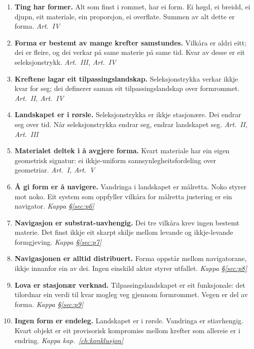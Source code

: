 \documentclass[12pt,a4paper,oneside]{report}
\begin{document}
\begin{enumerate}
  \item \textbf{Ting har former.} Alt som finst i rommet, har ei form. Ei høgd, ei breidd, ei djupn, eit materiale, ein proporsjon, ei overflate. Summen av alt dette er forma. \hfill\emph{Art.~IV}

  \item \textbf{Forma er bestemt av mange krefter samstundes.} Vilkåra er aldri eitt; dei er fleire, og dei verkar på same materie på same tid. Kvar av desse er eit seleksjonstrykk. \hfill\emph{Art.~III, Art.~IV}

  \item \textbf{Kreftene lagar eit tilpassingslandskap.} Seleksjonstrykka verkar ikkje kvar for seg; dei definerer saman eit tilpassingslandskap over formrommet. \hfill\emph{Art.~II, Art.~IV}

  \item \textbf{Landskapet er i rørsle.} Seleksjonstrykka er ikkje stasjonære. Dei endrar seg over tid. Når seleksjonstrykka endrar seg, endrar landskapet seg. \hfill\emph{Art.~II, Art.~III}

  \item \textbf{Materialet deltek i å avgjere forma.} Kvart materiale har ein eigen geometrisk signatur: ei ikkje-uniform sannsynlegheitsfordeling over geometriar. \hfill\emph{Art.~I, Art.~V}

  \item \textbf{Å gi form er å navigere.} Vandringa i landskapet er målretta. Noko styrer mot noko. Eit system som oppfyller vilkåra for målretta justering er ein navigator. \hfill\emph{Kappa \S\ref{sec:p6}}

  \item \textbf{Navigasjon er substrat-uavhengig.} Dei tre vilkåra krev ingen bestemt materie. Det finst ikkje eit skarpt skilje mellom levande og ikkje-levande formgjeving. \hfill\emph{Kappa \S\ref{sec:p7}}

  \item \textbf{Navigasjonen er alltid distribuert.} Forma oppstår mellom navigatorane, ikkje innanfor ein av dei. Ingen einskild aktør styrer utfallet. \hfill\emph{Kappa \S\ref{sec:p8}}

  \item \textbf{Lova er stasjonær verknad.} Tilpassingslandskapet er eit funksjonale: det tilordnar ein verdi til kvar mogleg veg gjennom formrommet. Vegen er del av forma. \hfill\emph{Kappa \S\ref{sec:p9}}

  \item \textbf{Ingen form er endeleg.} Landskapet er i rørsle. Vandringa er stiavhengig. Kvart objekt er eit provisorisk kompromiss mellom krefter som allereie er i endring. \hfill\emph{Kappa kap.~\ref{ch:konklusjon}}
\end{enumerate}
\end{document}
